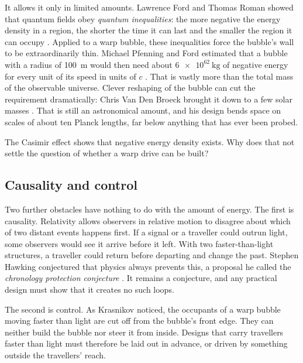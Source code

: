 It allows it only in limited amounts. Lawrence Ford and Thomas Roman showed that
quantum fields obey \emph{quantum inequalities}: the more negative the energy
density in a region, the shorter the time it can last and the smaller the region
it can occupy \parencite{Ford1995,Ford1997}. Applied to a warp bubble, these
inequalities force the bubble's wall to be extraordinarily thin. Michael
Pfenning and Ford estimated that a bubble with a radius of \SI{100}{\metre} would
then need about $\SI{6e62}{\kilogram}$ of negative energy for every unit of its
speed in units of $c$ \parencite{Pfenning1997}. That is vastly more than the
total mass of the observable universe. Clever reshaping of the bubble can cut
the requirement dramatically: Chris Van Den Broeck brought it down to a few
solar masses \parencite{VanDenBroeck1999}. That is still an astronomical
amount, and his design bends space on scales of about ten Planck lengths,
far below anything that has ever been probed.

\begin{checkpoint}
The Casimir effect shows that negative energy density exists. Why does that not
settle the question of whether a warp drive can be built?
\end{checkpoint}

\subsection{Causality and control}

Two further obstacles have nothing to do with the amount of energy. The first
is causality. Relativity allows observers in relative motion to disagree about
which of two distant events happens first. If a signal or a traveller could
outrun light, some observers would see it arrive before it left. With two
faster-than-light structures, a traveller could return before departing and
change the past. Stephen Hawking conjectured that physics always prevents
this, a proposal he called the \emph{chronology protection conjecture}
\parencite{Hawking1992}. It remains a conjecture, and any practical design
must show that it creates no such loops.

The second is control. As Krasnikov noticed, the occupants of a warp bubble
moving faster than light are cut off from the bubble's front edge. They can
neither build the bubble nor steer it from inside. Designs that carry
travellers faster than light must therefore be laid out in advance, or driven
by something outside the travellers' reach.

